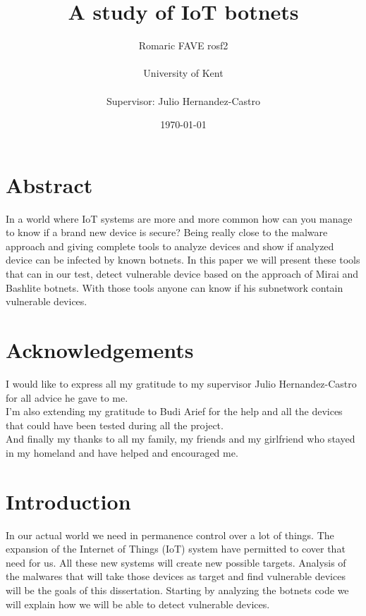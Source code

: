 \documentclass{report}
\date{\monthyeardate\today}
\begin{document}
\title{A study of IoT botnets}
\author{Romaric FAVE rosf2\\
  \\
  University of Kent\\
  \\
  Supervisor: Julio Hernandez-Castro
}

\maketitle

\tableofcontents

\chapter*{Abstract}
In a world where IoT systems are more and more common how can you manage to know if a brand new device is secure? Being really close to the malware approach and giving complete tools to analyze devices and show if analyzed device can be infected by known botnets. In this paper we will present these tools that can in our test, detect vulnerable device based on the approach of Mirai and Bashlite botnets. With those tools anyone can know if his subnetwork contain vulnerable devices.

\chapter*{Acknowledgements}
I would like to express all my gratitude to my supervisor Julio Hernandez-Castro for all advice he gave to me.\\
I'm also extending my gratitude to Budi Arief for the help and all the devices that could have been tested during all the project.\\
And finally my thanks to all my family, my friends and my girlfriend who stayed in my homeland and have helped and encouraged me.

\chapter{Introduction}
In our actual world we need in permanence control over a lot of things. The expansion of the Internet of Things (IoT) system have permitted to cover that need for us. All these new systems will create new possible targets. Analysis of the malwares that will take those devices as target and find vulnerable devices will be the goals of this dissertation.\newline
Starting by analyzing the botnets code we will explain how we will be able to detect vulnerable devices.
\end{document}
